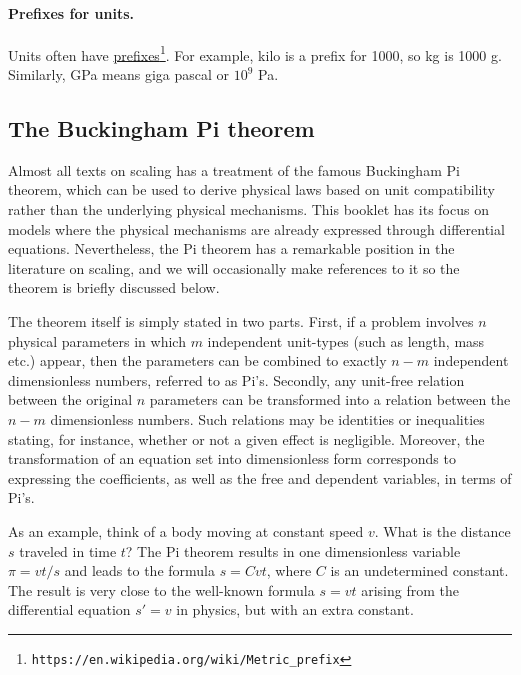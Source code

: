 \documentclass[graybox,envcountchap,sectrefs,final]{svmonodo}
\begin{document}
\noindent
\paragraph{Prefixes for units.}
Units often have \href{{https://en.wikipedia.org/wiki/Metric_prefix}}{prefixes}\footnote{\texttt{https://en.wikipedia.org/wiki/Metric\_prefix}}.
For example, kilo is a prefix for 1000,
so kg is 1000 g. Similarly, GPa means giga pascal or $10^9$ Pa.

\subsection{The Buckingham Pi theorem}
\label{scale:dimunit:Pi}


Almost all texts on scaling has a treatment of the famous Buckingham Pi
theorem, which can be used to derive physical laws based on
unit compatibility rather than the underlying physical mechanisms.
This booklet has its focus on models where the physical mechanisms are
already expressed through differential equations. Nevertheless, the Pi
theorem has a remarkable position in the literature on scaling, and we
will occasionally make references to it so the theorem is briefly
discussed below.

The theorem itself is simply stated in two parts. First, if a problem
involves $n$ physical parameters in which $m$ independent unit-types
(such as length, mass etc.) appear, then the parameters can be
combined to exactly $n-m$ independent dimensionless numbers, referred
to as Pi's. Secondly, any unit-free relation between the original $n$
parameters can be transformed into a relation between the $n-m$
dimensionless numbers.  Such relations may be identities or
inequalities stating, for instance, whether or not a given effect is
negligible. Moreover, the transformation of an equation set into
dimensionless form corresponds to expressing the coefficients, as well
as the free and dependent variables, in terms of Pi's.

As an example, think of a body moving at constant speed $v$. What
is the distance $s$ traveled in time $t$? The Pi theorem results in
one dimensionless variable $\pi = vt/s$ and leads to the formula
$s = Cvt$, where $C$ is an undetermined constant. The result is
very close to the well-known formula $s=vt$ arising from the differential
equation $s'=v$ in physics, but with an extra constant.
\end{document}
